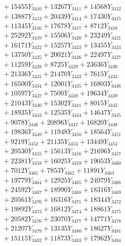 \documentclass[a4paper,10pt]{article}
\begin{document}
{\begin{align}
&\;  + 15455 Y_{3410} + 13267 Y_{3411} + 14568 Y_{3412} \\[0.3ex]
&\;  + 13887 Y_{3413} + 20439 Y_{3414} + 17430 Y_{3415} \\[0.3ex]
&\;  + 11345 Y_{3416} + 17678 Y_{3417} + 8712 Y_{3418} \\[0.5ex]\allowbreak
&\;  + 25292 Y_{3419} + 15506 Y_{3420} + 23249 Y_{3421} \\[0.3ex]
&\;  + 16171 Y_{3422} + 15257 Y_{3423} + 13455 Y_{3424} \\[0.3ex]
&\;  + 13750 Y_{3425} + 20021 Y_{3426} + 22497 Y_{3427} \\[0.3ex]
&\;  + 11259 Y_{3428} + 8725 Y_{3429} + 23636 Y_{3430} \\[0.3ex]
&\;  + 21336 Y_{3431} + 21470 Y_{3432} + 7615 Y_{3433} \\[0.3ex]
&\;  + 16500 Y_{3434} + 12001 Y_{3435} + 16803 Y_{3436} \\[0.3ex]
&\;  + 10597 Y_{3437} + 7500 Y_{3438} + 19634 Y_{3439} \\[0.3ex]
&\;  + 21043 Y_{3440} + 15302 Y_{3441} + 8015 Y_{3442} \\[0.3ex]
&\;  + 18935 Y_{3443} + 12535 Y_{3444} + 14647 Y_{3445} \\[0.3ex]
&\;  + 9078 Y_{3446} + 20896 Y_{3447} + 16820 Y_{3448} \\[0.5ex]\allowbreak
&\;  + 19836 Y_{3449} + 11948 Y_{3450} + 18564 Y_{3451} \\[0.3ex]
&\;  + 9219 Y_{3452} + 21135 Y_{3453} + 13449 Y_{3454} \\[0.3ex]
&\;  + 20530 Y_{3455} + 15613 Y_{3456} + 21696 Y_{3457} \\[0.3ex]
&\;  + 22381 Y_{3458} + 16025 Y_{3459} + 19053 Y_{3460} \\[0.3ex]
&\;  + 7012 Y_{3461} + 7853 Y_{3462} + 11891 Y_{3463} \\[0.3ex]
&\;  + 19779 Y_{3464} + 12925 Y_{3465} + 24979 Y_{3466} \\[0.3ex]
&\;  + 24592 Y_{3467} + 18990 Y_{3468} + 18316 Y_{3469} \\[0.3ex]
&\;  + 20561 Y_{3470} + 16316 Y_{3471} + 18344 Y_{3472} \\[0.3ex]
&\;  + 19892 Y_{3473} + 16812 Y_{3474} + 18861 Y_{3475} \\[0.3ex]
&\;  + 20582 Y_{3476} + 23070 Y_{3477} + 14771 Y_{3478} \\[0.5ex]\allowbreak
&\;  + 21207 Y_{3479} + 13135 Y_{3480} + 18627 Y_{3481} \\[0.3ex]
&\;  + 15115 Y_{3482} + 11873 Y_{3483} + 17962 Y_{3484} \\[0.3ex]

\end{align}}
\end{document}
